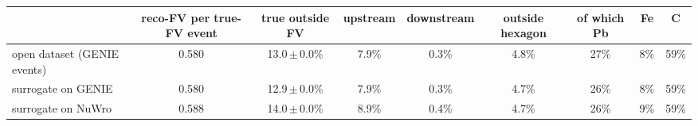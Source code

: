 \begin{tabular}{lcccccccc}
\toprule
 & reco-FV per true-FV event & true outside FV & upstream & downstream & outside hexagon & of which Pb & Fe & C \\
\midrule
open dataset (GENIE events) & 0.580 & 13.0\,$\pm$\,0.0\% & 7.9\% & 0.3\% & 4.8\% & 27\% & 8\% & 59\% \\
surrogate on GENIE & 0.580 & 12.9\,$\pm$\,0.0\% & 7.9\% & 0.3\% & 4.7\% & 26\% & 8\% & 59\% \\
surrogate on NuWro & 0.588 & 14.0\,$\pm$\,0.0\% & 8.9\% & 0.4\% & 4.7\% & 26\% & 9\% & 59\% \\
\bottomrule
\end{tabular}
